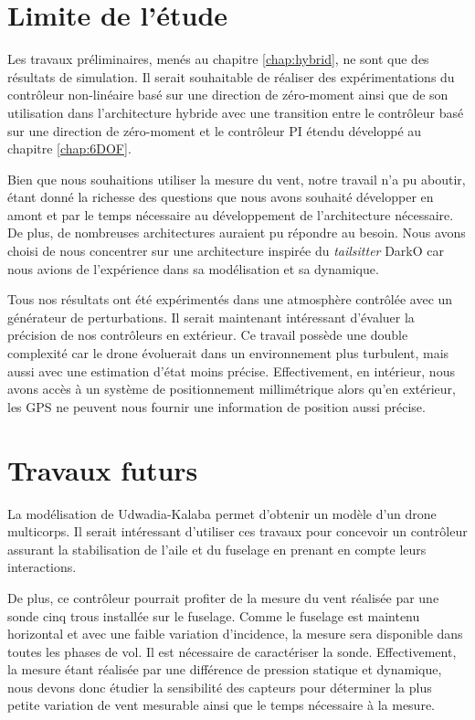 \section*{Limite de l'étude}
Les travaux préliminaires, menés au chapitre \ref{chap:hybrid}, ne sont que des résultats de simulation. Il serait souhaitable de réaliser des expérimentations du contrôleur non-linéaire basé sur une direction de zéro-moment ainsi que de son utilisation dans l'architecture hybride avec une transition entre le contrôleur basé sur une direction de zéro-moment et le contrôleur PI étendu développé au chapitre \ref{chap:6DOF}.

Bien que nous souhaitions utiliser la mesure du vent, notre travail n'a pu aboutir, étant donné la richesse des questions que nous avons souhaité développer en amont et par le temps nécessaire au développement de l'architecture nécessaire.
De plus, de nombreuses architectures auraient pu répondre au besoin. Nous avons choisi de nous concentrer sur une architecture inspirée du \textit{tailsitter} DarkO car nous avions de l'expérience dans sa modélisation et sa dynamique.

Tous nos résultats ont été expérimentés dans une atmosphère contrôlée avec un générateur de perturbations. Il serait maintenant intéressant d'évaluer la précision de nos contrôleurs en extérieur. Ce travail possède une double complexité car le drone évoluerait dans un environnement plus turbulent, mais aussi avec une estimation d'état moins précise. Effectivement, en intérieur, nous avons accès à un système de positionnement millimétrique alors qu'en extérieur, les GPS ne peuvent nous fournir une information de position aussi précise.


\section*{Travaux futurs}

La modélisation de Udwadia-Kalaba permet d'obtenir un modèle d'un drone multicorps. Il serait intéressant d'utiliser ces travaux pour concevoir un contrôleur assurant la stabilisation de l'aile et du fuselage en prenant en compte leurs interactions.

De plus, ce contrôleur pourrait profiter de la mesure du vent réalisée par une sonde cinq trous installée sur le fuselage. Comme le fuselage est maintenu horizontal et avec une faible variation d'incidence, la mesure sera disponible dans toutes les phases de vol. Il est nécessaire de caractériser la sonde. Effectivement, la mesure étant réalisée par une différence de pression statique et dynamique, nous devons donc étudier la sensibilité des capteurs pour déterminer la plus petite variation de vent mesurable ainsi que le temps nécessaire à la mesure.

